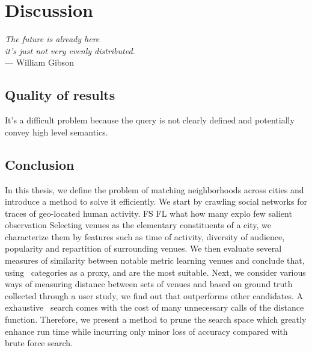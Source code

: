 \chapter{Discussion}
\label{chap:discussion}

\begin{flushright}{\slshape    
		The future is already here \\
		it's just not very evenly distributed.
    } \\ \medskip
    --- William Gibson
\end{flushright}

\section{Quality of results}

It's a difficult problem because the query is not clearly defined and
potentially convey high level semantics.

\section{Conclusion}

In this thesis, we define the problem of matching neighborhoods across cities
and introduce a method to solve it efficiently. We start by crawling social
networks for traces of geo-located human activity.
FS FL what how many
explo few salient observation
Selecting venues as the
elementary constituents of a city, we characterize them by features such as
time of activity, diversity of audience, popularity and repartition of
surrounding venues. We then evaluate several measures of similarity between
notable metric learning
venues and conclude that, using \fs\ categories as a proxy, \eucl{} and \lmnn{}
are the most suitable. Next, we consider various ways of measuring distance
between sets of venues and based on ground truth collected through a user
study, we find out that \emd{} outperforms other candidates. A exhaustive \emd\
search comes with the cost of many unnecessary calls of the distance function.
Therefore, we present a method to prune the search space which greatly enhance
run time while incurring only minor loss of accuracy compared with brute force
search.

